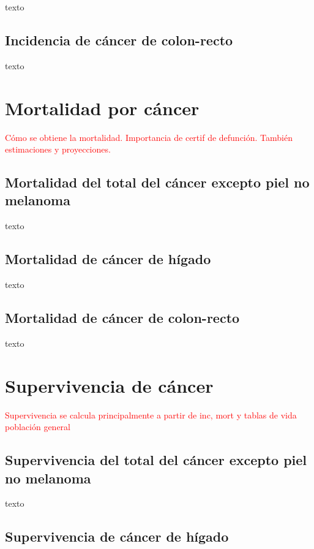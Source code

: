 texto

\subsection{Incidencia de cáncer de colon-recto}

texto

\section{Mortalidad por cáncer}

\textcolor{red}{Cómo se obtiene la mortalidad. Importancia de certif de defunción. También estimaciones y proyecciones.}

\subsection{Mortalidad del total del cáncer excepto piel no melanoma}

texto

\subsection{Mortalidad de cáncer de hígado}

texto

\subsection{Mortalidad de cáncer de colon-recto}

texto

\section{Supervivencia de cáncer} 

\textcolor{red}{Supervivencia se calcula principalmente a partir de inc, mort y tablas de vida población general}

\subsection{Supervivencia del total del cáncer excepto piel no melanoma}

texto

\subsection{Supervivencia de cáncer de hígado}

